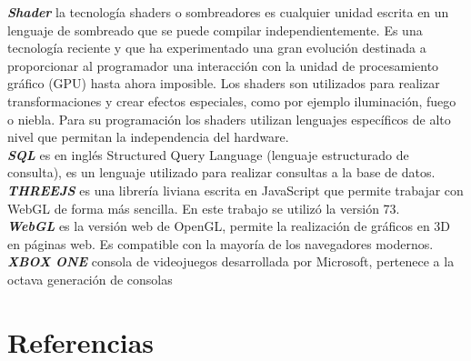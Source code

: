 \documentclass[12pt]{article}
\begin{document}
\textbf{\textit{Shader}} la tecnología shaders o sombreadores es cualquier unidad escrita en un lenguaje de sombreado que se puede compilar independientemente. Es una tecnología reciente y que ha experimentado una gran evolución destinada a proporcionar al programador una interacción con la unidad de procesamiento gráfico (GPU) hasta ahora imposible. Los shaders son utilizados para realizar transformaciones y crear efectos especiales, como por ejemplo iluminación, fuego o niebla. Para su programación los shaders utilizan lenguajes específicos de alto nivel que permitan la independencia del hardware.\\
\textbf{\textit{SQL}} es en inglés Structured Query Language (lenguaje estructurado de consulta), es un lenguaje utilizado para realizar consultas a la base de datos.\\
\textbf{\textit{THREEJS}} es una librería liviana escrita en JavaScript que permite trabajar con WebGL de forma más sencilla. En este trabajo se utilizó la versión 73.\\
\textbf{\textit{WebGL}} es la versión web de OpenGL, permite la realización de gráficos en 3D en páginas web. Es compatible con la mayoría de los navegadores modernos.\\
\textbf{\textit{XBOX ONE}} consola de videojuegos desarrollada por Microsoft, pertenece a la octava generación de consolas
\clearpage
\null\newpage
\section{Referencias}
\end{document}
